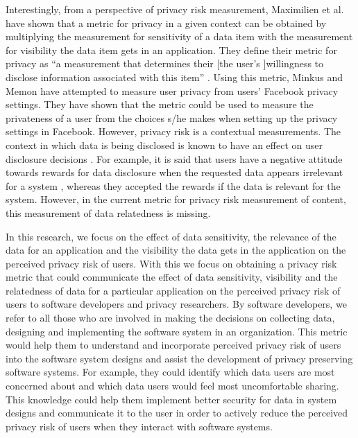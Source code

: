 \documentclass[10pt]{article}
\begin{document}
Interestingly, from a perspective of privacy risk measurement, Maximilien et al. \cite {maximilien2009privacy} have shown that a metric for privacy in a given context can be obtained by multiplying the measurement for sensitivity of a data item with the measurement for visibility the data item gets in an application. They define their metric for privacy as \enquote{a measurement that determines their [the user's ]willingness to disclose information associated with this item} \cite {maximilien2009privacy}. Using this metric, Minkus and Memon \cite{minkus2014scale} have attempted to measure user privacy from users' Facebook privacy settings. They have shown that the metric could be used to measure the privateness of a user from the choices s/he makes when setting up the privacy settings in Facebook. However, privacy risk is a contextual measurements. The context in which data is being disclosed \cite {nissenbaum2009privacy, john2010strangers} is known to have an effect on user disclosure decisions \cite {knijnenburg2013making}. For example, it is said that users have a negative attitude towards rewards for data disclosure when the requested data appears irrelevant for a system \cite {li2010understanding}, whereas they accepted the rewards if the data is relevant for the system. However, in the current metric for privacy risk measurement of content, this measurement of data relatedness is missing.

In this research, we focus on the effect of data sensitivity, the relevance of the data for an application and the visibility the data gets in the application on the perceived privacy risk of users. With this we focus on obtaining a privacy risk metric that could communicate the effect of data sensitivity, visibility and the relatedness of data for a particular application on the perceived privacy risk of users to software developers and privacy researchers. By software developers, we refer to all those who are involved in making the decisions on collecting data, designing and implementing the software system in an organization. This metric would help them to understand and incorporate perceived privacy risk of users into the software system designs and assist the development of privacy preserving software systems. For example, they could identify which data users are most concerned about and which data users would feel most uncomfortable sharing. This knowledge could help them implement better security for data in system designs and communicate it to the user in order to actively reduce the perceived privacy risk of users when they interact with software systems.
\end{document}
